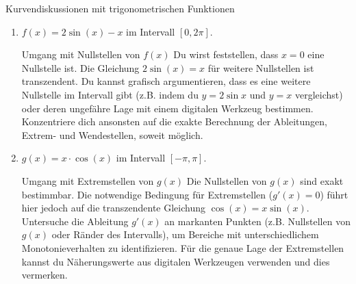 \begin{aufgabenumgebung}{Kurvendiskussionen mit trigonometrischen Funktionen}
\begin{enumerate}
    \item $f(x) = 2\sin(x) - x$ im Intervall $[0, 2\pi]$.
        \begin{tippumgebung}{Umgang mit Nullstellen von $f(x)$}
        Du wirst feststellen, dass $x=0$ eine Nullstelle ist. Die Gleichung $2\sin(x) = x$ für weitere Nullstellen ist transzendent. Du kannst grafisch argumentieren, dass es eine weitere Nullstelle im Intervall gibt (z.B. indem du $y=2\sin x$ und $y=x$ vergleichst) oder deren ungefähre Lage mit einem digitalen Werkzeug bestimmen. Konzentriere dich ansonsten auf die exakte Berechnung der Ableitungen, Extrem- und Wendestellen, soweit möglich.
        \end{tippumgebung}
    \item $g(x) = x \cdot \cos(x)$ im Intervall $[-\pi, \pi]$.
        \begin{tippumgebung}{Umgang mit Extremstellen von $g(x)$}
        Die Nullstellen von $g(x)$ sind exakt bestimmbar. Die notwendige Bedingung für Extremstellen ($g'(x)=0$) führt hier jedoch auf die transzendente Gleichung $\cos(x) = x\sin(x)$. Untersuche die Ableitung $g'(x)$ an markanten Punkten (z.B. Nullstellen von $g(x)$ oder Ränder des Intervalls), um Bereiche mit unterschiedlichem Monotonieverhalten zu identifizieren. Für die genaue Lage der Extremstellen kannst du Näherungswerte aus digitalen Werkzeugen verwenden und dies vermerken.
        \end{tippumgebung}
\end{enumerate}
\end{aufgabenumgebung}




